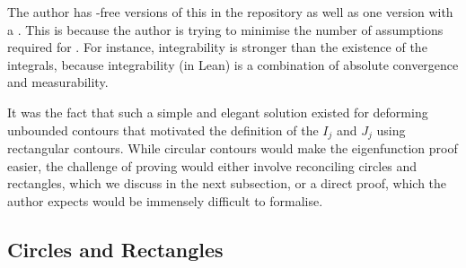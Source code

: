 The author has \sorry-free versions of this in the repository as well as one version with a \sorry. This is because the author is trying to minimise the number of assumptions required for . For instance, integrability is stronger than the existence of the integrals, because integrability (in Lean) is a combination of absolute convergence and measurability.

It was the fact that such a simple and elegant solution existed for deforming unbounded contours that motivated the definition of the $I_j$ and $J_j$ using rectangular contours. While circular contours would make the eigenfunction proof easier, the challenge of proving  would either involve reconciling circles and rectangles, which we discuss in the next subsection, or a direct proof, which the author expects would be immensely difficult to formalise.

\subsection{Circles and Rectangles}

